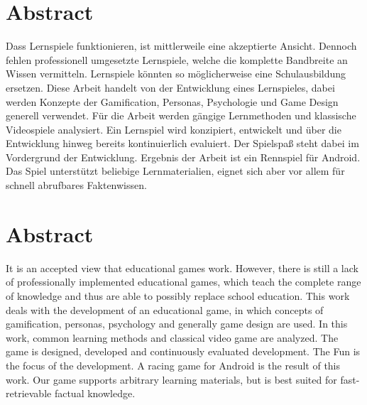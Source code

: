 \section*{Abstract}
Dass Lernspiele funktionieren, ist mittlerweile eine akzeptierte Ansicht. Dennoch fehlen professionell umgesetzte Lernspiele, welche die komplette Bandbreite an Wissen vermitteln. Lernspiele könnten so möglicherweise eine Schulausbildung ersetzen.
Diese Arbeit handelt von der Entwicklung eines Lernspieles, dabei werden Konzepte der Gamification, Personas, Psychologie und Game Design generell verwendet. Für die Arbeit werden gängige Lernmethoden und klassische Videospiele analysiert. Ein Lernspiel wird konzipiert, entwickelt und über die Entwicklung hinweg bereits kontinuierlich evaluiert. Der Spielspaß steht dabei im Vordergrund der Entwicklung.
Ergebnis der Arbeit ist ein Rennspiel für Android. Das Spiel unterstützt beliebige Lernmaterialien, eignet sich aber vor allem für schnell abrufbares Faktenwissen.

\vfill

\section*{Abstract}
It is an accepted view that educational games work. However, there is still a lack of professionally implemented educational games, which teach the complete range of knowledge and thus are able to possibly replace school education.
This work deals with the development of an educational game, in which concepts of gamification, personas, psychology and generally game design are used. In this work, common learning methods and classical video game are analyzed. The game is designed, developed and continuously evaluated development. The Fun is the focus of the development.
A racing game for Android is the result of this work. Our game supports arbitrary learning materials, but is best suited for fast-retrievable factual knowledge.

\vfill\vfill\newpage
